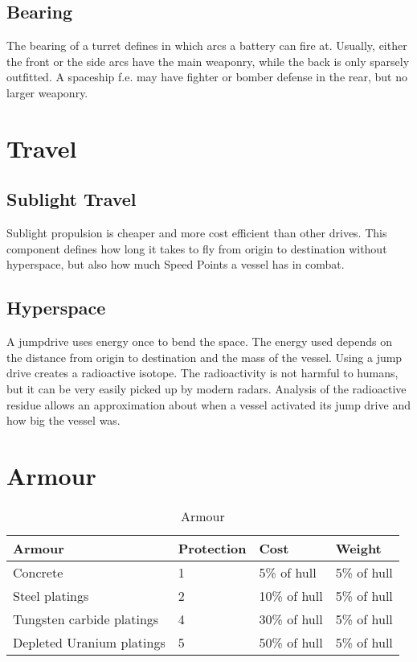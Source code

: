 \subsection{Bearing}
\label{sub:Bearing}

The bearing of a turret defines in which arcs a battery can fire at. Usually, either the front or the side arcs have the main weaponry, while the back is only sparsely outfitted. A spaceship f.e. may have fighter or bomber defense in the rear, but no larger weaponry.

\section{Travel}
\label{sec:Travel}

\subsection{Sublight Travel}
\label{sub:Sublight Travel}

Sublight propulsion is cheaper and more cost efficient than other drives. This component defines how long it takes to fly from origin to destination without hyperspace, but also how much Speed Points a vessel has in combat.

\subsection{Hyperspace}
\label{sub:Hyperspace}

A jumpdrive uses energy once to bend the space. The energy used depends on the distance from origin to destination and the mass of the vessel. Using a jump drive creates a radioactive isotope. The radioactivity is not harmful to humans, but it can be very easily picked up by modern radars. Analysis of the radioactive residue allows an approximation about when a vessel activated its jump drive and how big the vessel was.

\section{Armour}
\label{sec:Armour}

\begin{table}[H]
  \centering
  \caption{Armour}
  \label{tab:vessel-armour}
  \begin{tabularx}{\textwidth}{|l|l|l|l|}
    \hline
    Armour                    & Protection & Cost         & Weight      \\  \hline
    Concrete                  & 1          & 5\% of hull  & 5\% of hull \\ \hline
    Steel platings            & 2          & 10\% of hull & 5\% of hull \\ \hline
    Tungsten carbide platings & 4          & 30\% of hull & 5\% of hull \\ \hline
    Depleted Uranium platings & 5          & 50\% of hull & 5\% of hull \\ \hline
  \end{tabularx}
\end{table}

